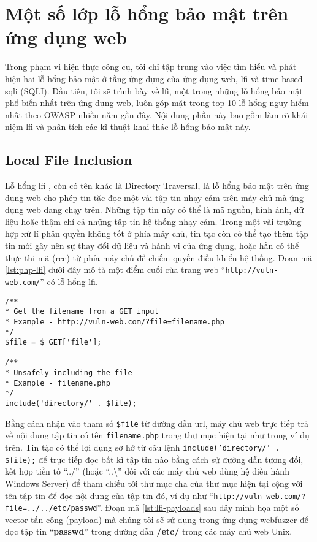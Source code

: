\chapter{Một số lớp lỗ hổng bảo mật trên ứng dụng web}
Trong phạm vi hiện thực công cụ, tôi chỉ tập trung vào việc tìm hiểu và phát hiện hai lỗ hổng bảo mật ở tầng ứng dụng của ứng dụng web, \acrfull{lfi} và time-based \acrlong{sqli} (SQLI). Đầu tiên, tôi sẽ trình bày về \acrfull{lfi}, một trong những lỗ hổng bảo mật phổ biến nhất trên ứng dụng web, luôn góp mặt trong top 10 lỗ hổng nguy hiểm nhất theo OWASP \parencite{owasp-top-10} nhiều năm gần đây. Nội dung phần này bao gồm làm rõ khái niệm \acrshort{lfi} và phân tích các kĩ thuật khai thác lỗ hổng bảo mật này.
\section{Local File Inclusion}
Lỗ hổng \acrfull{lfi} \parencite{portswigger-directory-traversal, sullivan2011web}, còn có tên khác là Directory Traversal, là lỗ hổng bảo mật trên ứng dụng web cho phép tin tặc đọc một vài tập tin nhạy cảm trên máy chủ mà ứng dụng web đang chạy trên. Những tập tin này có thể là mã nguồn, hình ảnh, dữ liệu hoặc thậm chí cả những tập tin hệ thống nhạy cảm. Trong một vài trường hợp xử lí phân quyền không tốt ở phía máy chủ, tin tặc còn có thể tạo thêm tập tin mới gây nên sự thay đổi dữ liệu và hành vi của ứng dụng, hoặc hắn có thể thực thi mã (\acrshort{rce}) từ phía máy chủ để chiếm quyền điều khiển hệ thống. Đoạn mã \ref{lst:php-lfi} dưới đây mô tả một điểm cuối của trang web ``\texttt{http://vuln-web.com/}'' có lỗ hổng \acrshort{lfi}.
\begin{lstlisting}[style=PHP, label={lst:php-lfi},caption={Đoạn mã PHP có lỗ hổng Local File Inclusion}]
/**
* Get the filename from a GET input
* Example - http://vuln-web.com/?file=filename.php
*/
$file = $_GET['file'];

/**
* Unsafely including the file
* Example - filename.php
*/
include('directory/' . $file);
\end{lstlisting}
Bằng cách nhận vào tham số \texttt{\$file} từ đường dẫn \acrshort{url}, máy chủ web trực tiếp trả về nội dung tập tin có tên \texttt{filename.php} trong thư mục hiện tại như trong ví dụ trên. Tin tặc có thể lợi dụng sơ hở từ câu lệnh \texttt{include('directory/' . \$file);} để trực tiếp đọc bất kì tập tin nào bằng cách sử đường dẫn tương đối, kết hợp tiền tố ``../'' (hoặc ``..\textbackslash'' đối với các máy chủ web dùng hệ điều hành Windows Server) để tham chiếu tới thư mục cha của thư mục hiện tại cộng với tên tập tin để đọc nội dung của tập tin đó, ví dụ như ``\texttt{http://vuln-web.com/?file=../../etc/passwd}''. Đoạn mã \ref{lst:lfi-payloads} sau đây minh họa một số vector tấn công (payload) mà chúng tôi sẽ sử dụng trong ứng dụng webfuzzer để đọc tập tin ``\textbf{passwd}'' trong đường dẫn \textbf{/etc/} trong các máy chủ web Unix.
